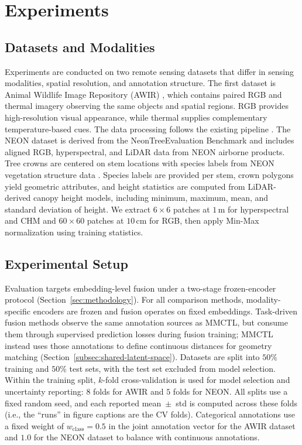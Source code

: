 \documentclass[10pt,twocolumn,letterpaper]{article}
\begin{document}
\section{Experiments}

\subsection{Datasets and Modalities}
\label{subsec:datasets}

Experiments are conducted on two remote sensing datasets that differ in sensing modalities, spatial resolution, and annotation structure.
The first dataset is Animal Wildlife Image Repository (AWIR) \cite{samiappan2024aerial, zhou2025multi}, which contains paired RGB and thermal imagery observing the same objects and spatial regions. RGB provides high-resolution visual appearance, while thermal supplies complementary temperature-based cues. The data processing follows the existing pipeline \cite{zhou2025multi}. The NEON dataset is derived from the NeonTreeEvaluation Benchmark \cite{Weinstein_Marconi_White_2022} and includes aligned RGB, hyperspectral, and LiDAR data from NEON airborne products. Tree crowns are centered on stem locations with species labels from NEON vegetation structure data \cite{NEON_vegetation_structure}. Species labels are provided per stem, crown polygons yield geometric attributes, and height statistics are computed from LiDAR-derived canopy height models, including minimum, maximum, mean, and standard deviation of height. We extract $6\times6$ patches at $1\,\mathrm{m}$ for hyperspectral and CHM and $60\times60$ patches at $10\,\mathrm{cm}$ for RGB, then apply Min-Max normalization using training statistics.

\subsection{Experimental Setup}
Evaluation targets embedding-level fusion under a two-stage frozen-encoder protocol (Section~\ref{sec:methodology}). For all comparison methods, modality-specific encoders are frozen and fusion operates on fixed embeddings. Task-driven fusion methods observe the same annotation sources as MMCTL, but consume them through supervised prediction losses during fusion training; MMCTL instead uses those annotations to define continuous distances for geometry matching (Section~\ref{subsec:shared-latent-space}). Datasets are split into $50\%$ training and $50\%$ test sets, with the test set excluded from model selection. Within the training split, $k$-fold cross-validation is used for model selection and uncertainty reporting: $8$ folds for AWIR and $5$ folds for NEON. All splits use a fixed random seed, and each reported mean~$\pm$~std is computed across these folds (i.e., the ``runs'' in figure captions are the CV folds). Categorical annotations use a fixed weight of $w_{\text{class}} = 0.5$ in the joint annotation vector for the AWIR dataset and $1.0$ for the NEON dataset to balance with continuous annotations.
\end{document}
